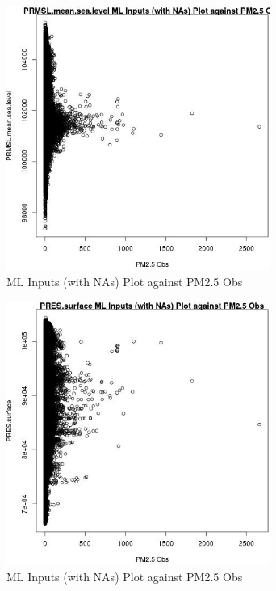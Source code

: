 \begin{figure} 
\centering  
\includegraphics[width=0.77\textwidth]{Code_Outputs/Report_ML_input_PM25_Step4_part_e_de_duplicated_aves_compiled_2019-05-20wNAs_PRMSLmeansealevelvPM25_Obs.jpg} 
\caption{\label{fig:Report_ML_input_PM25_Step4_part_e_de_duplicated_aves_compiled_2019-05-20wNAsPRMSLmeansealevelvPM25_Obs}ML Inputs (with NAs) Plot against PM2.5 Obs} 
\end{figure} 
 

\begin{figure} 
\centering  
\includegraphics[width=0.77\textwidth]{Code_Outputs/Report_ML_input_PM25_Step4_part_e_de_duplicated_aves_compiled_2019-05-20wNAs_PRESsurfacevPM25_Obs.jpg} 
\caption{\label{fig:Report_ML_input_PM25_Step4_part_e_de_duplicated_aves_compiled_2019-05-20wNAsPRESsurfacevPM25_Obs}ML Inputs (with NAs) Plot against PM2.5 Obs} 
\end{figure} 
 

